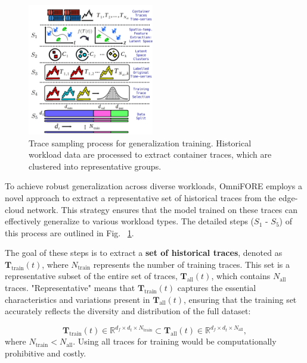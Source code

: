 \documentclass{ieeetmlcn}
\begin{document}
\begin{figure}
\centering
\includegraphics[width=0.49\textwidth]{img/proposed_solution_trace_selection.pdf}
\caption{Trace sampling process for generalization training. Historical workload data are processed to extract container traces, which are clustered into representative groups.}
\label{fig:proposed_solution_trace_selection}
\end{figure}

To achieve robust generalization across diverse workloads, OmniFORE employs a novel approach to extract a representative set of historical traces from the edge-cloud network. This strategy ensures that the model trained on these traces can effectively generalize to various workload types. The detailed steps ($S_1$ - $S_5$) of this process are outlined in Fig. ~\ref{fig:proposed_solution_trace_selection}.

The goal of these steps is to extract a \textbf{set of historical traces}, denoted as \(\mathbf{T}_{\text{train}}(t)\), where \(N_{\text{train}}\) represents the number of training traces. This set is a representative subset of the entire set of traces, \(\mathbf{T}_{\text{all}}(t)\), which contains \(N_{\text{all}}\) traces. "Representative" means that \(\mathbf{T}_{\text{train}}(t)\) captures the essential characteristics and variations present in \(\mathbf{T}_{\text{all}}(t)\), ensuring that the training set accurately reflects the diversity and distribution of the full dataset:

\begin{equation}
\mathbf{T}_{\text{train}}(t) \in \mathbb{R}^{d_f \times d_t \times N_{\text{train}}} \subset \mathbf{T}_{\text{all}}(t) \in \mathbb{R}^{d_f \times d_t \times N_{\text{all}}},
\end{equation}
where $N_{\text{train}} < N_{\text{all}}$. Using all traces for training would be computationally prohibitive and costly.
\end{document}
